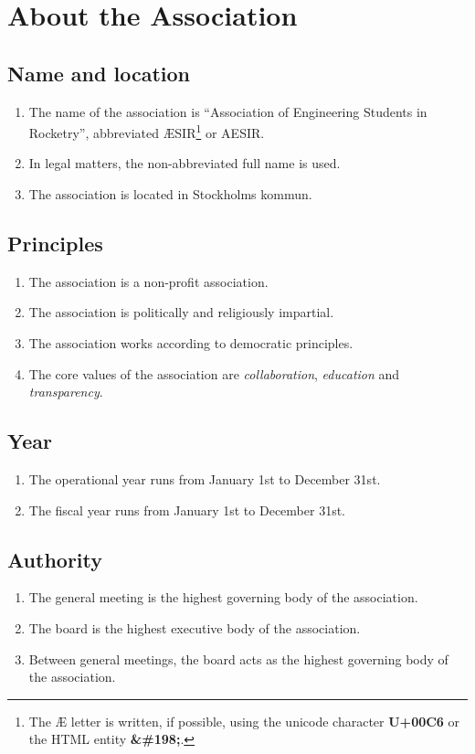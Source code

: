 
\section*{About the Association}

\subsection{Name and location}
\begin{enumerate}
  \item The name of the association is “Association of Engineering Students in Rocketry”, abbreviated ÆSIR\footnote{The Æ letter is written, if possible, using the unicode character \textbf{U+00C6} or the HTML entity \textbf{\&\#198;}.} or AESIR.
  \item In legal matters, the non-abbreviated full name is used.
  \item The association is located in Stockholms kommun.
\end{enumerate}

\subsection{Principles}
\begin{enumerate}
  \item The association is a non-profit association.
  \item The association is politically and religiously impartial.
  \item The association works according to democratic principles.
  \item The core values of the association are \emph{collaboration}, \emph{education} and \emph{transparency}.
\end{enumerate}


\subsection{Year}
\begin{enumerate}
  \item The operational year runs from January 1st to December 31st.
  \item The fiscal year runs from January 1st to December 31st.
\end{enumerate}


\subsection{Authority}
\begin{enumerate}
  \item The general meeting is the highest governing body of the association.
  \item The board is the highest executive body of the association.
  \item Between general meetings, the board acts as the highest governing body of the association. 
\end{enumerate}

